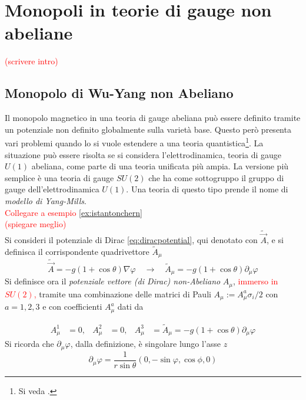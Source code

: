 \chapter{Monopoli in teorie di gauge non abeliane}
\textcolor{red}{(scrivere intro)}\\
%
\section{Monopolo di Wu-Yang non Abeliano}
Il monopolo magnetico in una teoria di gauge abeliana può essere definito tramite
un potenziale non definito globalmente sulla varietà base. Questo però presenta
vari problemi quando lo si vuole estendere a una teoria quantistica\footnote{
   Si veda \cite{nakahara}.
}.
La situazione può essere risolta se si considera l'elettrodinamica, teoria
di gauge $U(1)$ abeliana, come parte di una teoria unificata più ampia. La versione
più semplice è una teoria di gauge $SU(2)$ che ha come sottogruppo il gruppo
di gauge dell'elettrodinamica $U(1)$. Una teoria di questo tipo prende il nome
di \emph{modello di Yang-Mills}. \\

\textcolor{red}{Collegare a esempio }\ref{ex:istantonchern}\\

\textcolor{red}{(spiegare meglio)}\\
Si consideri il potenziale di Dirac \ref{eq:diracpotential}, qui denotato con
$\tilde{\vec A}$, e si definisca il corrispondente quadrivettore $\tilde{A}_\mu$
$$
   \tilde{\vec A} = -g(1 + \cos\theta) \nabla \varphi
   \quad \to \quad
   \tilde{A}_\mu = -g(1 + \cos\theta) \partial_\mu \varphi
$$
Si definisce ora il \emph{potenziale vettore (di Dirac) non-Abeliano} $A_\mu$, \textcolor{red}{
immerso in $SU(2)$,} tramite una combinazione delle matrici di Pauli
$A_\mu := A_\mu^a \sigma_i/2$ con $a = 1,2,3$ e con coefficienti $A_\mu^a$ dati da

\begin{equation}\label{eq:wuyangpotential}
   \begin{aligned}
      A_\mu^1 &= 0, & A_\mu^2 &= 0, & A_\mu^3 &= \tilde{A}_\mu =
         -g(1 + \cos\theta) \partial_\mu \varphi
   \end{aligned}
\end{equation}
Si ricorda che $\partial_\mu \varphi$, dalla definizione, è singolare lungo l'asse $z$
$$
   \partial_\mu \varphi = \frac{1}{r \sin\theta} (0,-\sin\varphi,\cos\phi,0)
$$

